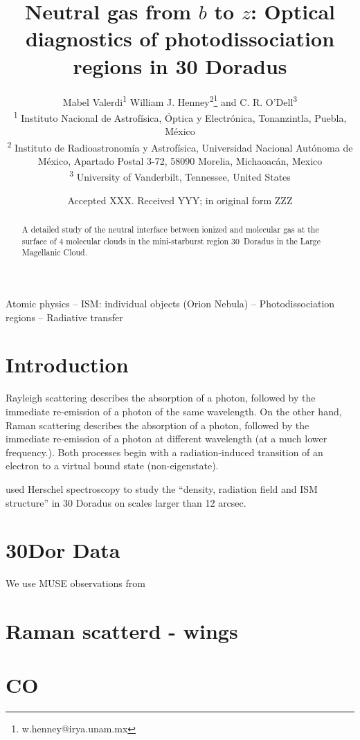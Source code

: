 \documentclass[useAMS, usenatbib, a4paper]{mnras}
\title[Neutral gas in 30 Dor]
{Neutral gas from $b$ to $z$:
  Optical diagnostics of photodissociation regions in 30 Doradus
}
\author[Henney]{
  Mabel Valerdi\textsuperscript{1}
  William J. Henney\textsuperscript{2}\thanks{w.henney@irya.unam.mx}
  and C. R. O'Dell\textsuperscript{3}
  \\
  \textsuperscript{1}\foreignlanguage{spanish}{%
    Instituto Nacional de Astrofísica, Óptica y Electrónica,
    Tonanzintla, Puebla, México}\\
  \textsuperscript{2}\foreignlanguage{spanish}{%
    Instituto de Radioastronomía y
    Astrofísica, Universidad Nacional Autónoma de México, Apartado
    Postal 3-72, 58090 Morelia, Michaoacán, Mexico}\\
  \textsuperscript{3}%
  University of Vanderbilt, Tennessee, United States
}
\date{Accepted XXX. Received YYY; in original form ZZZ}
\begin{document}
\label{firstpage}
\pagerange{\pageref{firstpage}--\pageref{lastpage}}
\maketitle



\begin{abstract}
  A detailed study of the neutral interface between ionized and
  molecular gas at the surface of 4 molecular clouds in the
  mini-starburst region 30~Doradus in the Large Magellanic Cloud.
\end{abstract}
\begin{keywords}
  Atomic physics
  -- ISM: individual objects (Orion Nebula)
  -- Photodissociation regions
  -- Radiative transfer
\end{keywords}
\section{Introduction}
\label{sec:introduction}

Rayleigh scattering describes the absorption of a photon, followed by the immediate re-emission of a photon of the same wavelength. On the other hand, Raman scattering describes the absorption of a photon, followed by the immediate re-emission of a photon at different wavelength (at a much lower frequency.). Both processes begin with a radiation-induced transition of an electron to a virtual bound state (non-eigenstate). 


\citet{Chevance:2016c} used Herschel spectroscopy to study the ``density, radiation field and ISM structure'' in 30 Doradus on scales larger than 12 arcsec. 


\section{30Dor Data}

We use MUSE observations from \citet{Castro:2018a}

\section{Raman scatterd - wings}

\section{CO}
\end{document}

